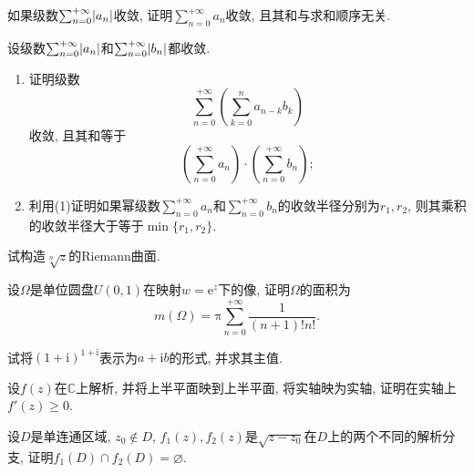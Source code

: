 \begin{yyEx}
    如果级数$\sum_{n=0}^{+\infty}\lvert a_n\rvert$收敛, 证明$\sum_{n=0}^{+\infty}a_n$收敛, 且其和与求和顺序无关.
\end{yyEx}

\begin{yyEx}
    设级数$\sum_{n=0}^{+\infty}\lvert a_n\rvert$和$\sum_{n=0}^{+\infty}\lvert b_n\rvert$都收敛.
    \begin{enumerate}
        \item 证明级数\begin{equation*}
            \sum_{n = 0}^{+\infty}\left(\sum_{k = 0}^n a_{n-k}b_k \right)
        \end{equation*}收敛, 且其和等于
        \begin{equation*}
            \left(\sum_{n = 0}^{+\infty}a_n\right)\cdot \left(\sum_{n = 0}^{+\infty}b_n\right);
        \end{equation*}
        \item 利用(1)证明如果幂级数$\sum_{n=0}^{+\infty}a_n$和$\sum_{n=0}^{+\infty}b_n$的收敛半径分别为$r_1,r_2$, 则其乘积的收敛半径大于等于$\min\{r_1,r_2\}$.
    \end{enumerate}
\end{yyEx}

\begin{yyEx}
    试构造$\sqrt[n]{z}$的Riemann曲面.
\end{yyEx}

\begin{yyEx}
    设$\Omega$是单位圆盘$U(0,1)$在映射$w = \mathrm{e}^z$下的像, 证明$\Omega$的面积为
    \begin{equation*}
        m(\Omega) = \mathrm{\pi}\sum_{n = 0}^{+\infty}\frac{1}{(n+1)!n!}.
    \end{equation*}
\end{yyEx}

\begin{yyEx}
    试将$(1+\mathrm{i})^{1+\mathrm{i}}$表示为$a+\mathrm{i}b$的形式, 并求其主值.
\end{yyEx}

\begin{yyEx}
    设$f(z)$在$\mathbb{C}$上解析, 并将上半平面映到上半平面, 将实轴映为实轴, 证明在实轴上$f'(z)\geqslant 0$.
\end{yyEx}

\begin{yyEx}
    设$D$是单连通区域, $z_0\notin D$, $f_1(z),f_2(z)$是$\sqrt{z-z_0}$在$D$上的两个不同的解析分支, 证明$f_1(D)\cap f_2(D)=\varnothing$.
\end{yyEx}

